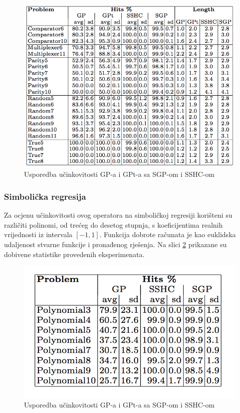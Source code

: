  \begin{figure}[H]
	\centering
	\includegraphics[scale=0.5]{./slike/semBoolTable.png}
	\caption{Usporedba učinkovitosti GP-a i GPt-a sa SGP-om i SSHC-om}
	\label{semBoolTable}
\end{figure}

\subsubsection{Simbolička regresija}

Za ocjenu učinkovitosti ovog operatora na simboličkoj regresiji korišteni su različiti polinomi, od trećeg do desetog stupnja, s koeficijentima realnih vrijednosti iz intervala $[-1, 1]$. Funkcija dobrote računata je kao euklidska udaljenost stvarne funkcije i pronađenog rješenja. Na slici \ref{semSymbTable} prikazane su dobivene statistike provedenih eksperimenata.

 \begin{figure}[H]
	\centering
	\includegraphics[scale=0.4]{./slike/semSymbTable.png}
	\caption{Usporedba učinkovitosti GP-a i GPt-a sa SGP-om i SSHC-om}
	\label{semSymbTable}
\end{figure}

